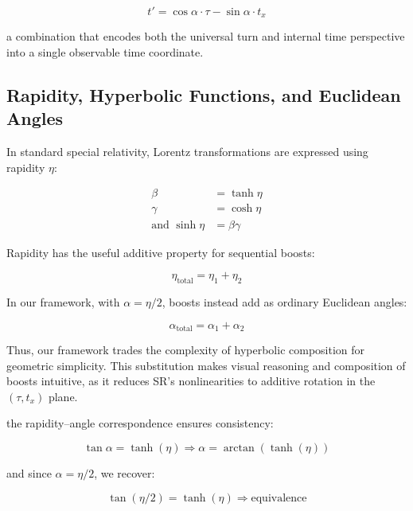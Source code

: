 \documentclass{article}
\begin{document}
\begin{equation}
    t' = \cos\alpha \cdot \tau - \sin\alpha \cdot t_x
\end{equation}


a combination that encodes both the universal turn and internal time perspective into a single observable time coordinate.

\subsection{Rapidity, Hyperbolic Functions, and Euclidean Angles}

In standard special relativity, Lorentz transformations are expressed using rapidity $\eta$:

\begin{equation}
\begin{aligned}
    \beta &= \tanh \eta \\
    \gamma &= \cosh \eta \\
    \text{and } \sinh \eta &= \beta \gamma
\end{aligned}
\end{equation}

Rapidity has the useful additive property for sequential boosts:

\begin{equation}
    \eta_{\text{total}} = \eta_1 + \eta_2
\end{equation}

In our framework, with $\alpha = \eta/2$, boosts instead add as ordinary Euclidean angles:

\begin{equation}
    \alpha_{\text{total}} = \alpha_1 + \alpha_2
\end{equation}

Thus, our framework trades the complexity of hyperbolic composition for geometric simplicity. This substitution makes visual reasoning and composition of boosts intuitive, as it reduces SR’s nonlinearities to additive rotation in the $(\tau, t_x)$ plane.


the rapidity–angle correspondence ensures consistency:

\begin{equation}
    \tan \alpha = \tanh(\eta) \Rightarrow \alpha = \arctan(\tanh(\eta))
\end{equation}

and since $\alpha = \eta/2$, we recover:

\begin{equation}
    \tan(\eta/2) = \tanh(\eta) \Rightarrow \text{equivalence}
\end{equation}
\end{document}
